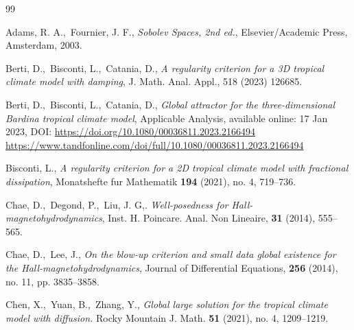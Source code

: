\documentclass[a4paper]{article}
\begin{document}
\begin{thebibliography}{99}

\footnotesize
	
 Adams, R. A.,\ Fournier, J. F., \emph{Sobolev Spaces, 2nd
    ed.}, Elsevier/Academic Press, Amsterdam, 2003.

 Berti, D.,\ Bisconti, L.,\ Catania, D., \emph{A
    regularity criterion for a 3D tropical climate model with
    damping}, J. Math. Anal. Appl., 518 (2023) 126685.

 Berti, D.,\ Bisconti, L.,\ Catania, D., \emph{Global
    attractor for the three-dimensional Bardina tropical climate
    model}, Applicable Analysis, available online: 17 Jan 2023,
  DOI:  \url{https://doi.org/10.1080/00036811.2023.2166494}\newline
  \url{https://www.tandfonline.com/doi/full/10.1080/00036811.2023.2166494}

   Bisconti, L., \emph{A regularity criterion for a 2D
    tropical climate model with fractional dissipation}, Monatshefte
  fur Mathematik \textbf{194} (2021), no. 4, 719--736.
  
%

%

 Chae, D.,\ Degond, P.,\ Liu, J. G,. \emph{Well-posedness
    for Hall-magnetohydrodynamics}, Inst. H. Poincare. Anal. Non
  Lineaire, \textbf{31} (2014), 555--565.

 Chae, D.,\  Lee, J., \emph{On the blow-up criterion and
    small data global existence for the Hall-magnetohydrodynamics},
  Journal of Differential Equations, \textbf{256} (2014), no. 11,
  pp. 3835--3858.
    
 Chen, X.,\ Yuan, B.,\ Zhang, Y., \emph{Global
    large solution for the tropical climate model with diffusion.}
  Rocky Mountain J. Math. \textbf{51} (2021), no. 4, 1209--1219. 
  

\end{thebibliography}
\end{document}
